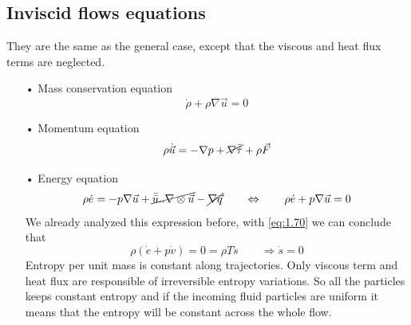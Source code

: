 	\subsection{Inviscid flows equations}
		They are the same as the general case, except that the viscous and heat flux terms are neglected. 
		\begin{itemize}
			\item[•] Mass conservation equation 
			\begin{equation}
				\dot{\rho} + \rho \nabla \vec{u} = 0 
			\end{equation}
			
			\item[•] Momentum equation
			\begin{equation}
				\rho \dot{\vec{u}} = - \nabla p + \cancel{\nabla \bar{\bar{\tau}}} + \rho \vec{F}
			\end{equation}
			
			\item[•] Energy equation
			\begin{equation}
				\rho \dot{e} = - p \nabla \vec{u} + \cancel{\bar{\bar{u}} .. \nabla \otimes \vec{u}} - \cancel{\nabla \vec{q}} \qquad \Leftrightarrow \qquad \rho \dot{e} + p\nabla \vec{u} = 0
			\end{equation}
			We already analyzed this expression before, with \eqref{eq:1.70} we can conclude that 
			\begin{equation}
				\rho (\dot{e}+ p\dot{v}) = 0 = \rho T\dot{s} \qquad \Rightarrow \dot{s} = 0
			\end{equation}
			Entropy per unit mass is constant along trajectories. Only viscous term and heat flux are responsible of irreversible entropy variations. So all the particles keeps constant entropy and if the incoming fluid particles are uniform it means that the entropy will be constant across the whole flow.  \\
			\end{itemize}
			

